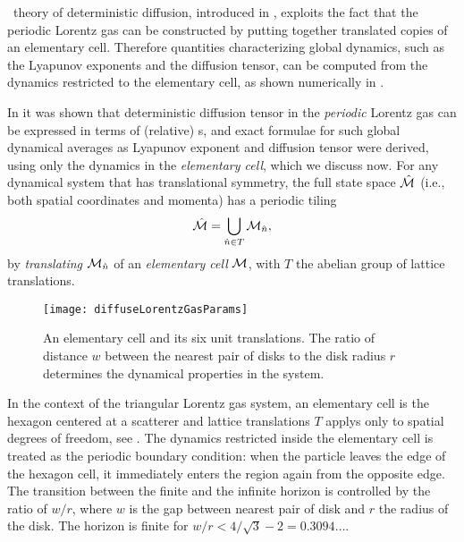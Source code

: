

\Po\ theory of deterministic diffusion, introduced in
, exploits the fact that the periodic
Lorentz gas can be constructed by putting together translated copies
of an elementary cell.  Therefore quantities characterizing global
dynamics, such as the Lyapunov exponents and the diffusion tensor, can
be computed from the dynamics restricted to the elementary cell, as
shown numerically in .

In  it was shown
that deterministic diffusion tensor in the {\em periodic} Lorentz gas
can be expressed in terms of (relative) \po s, and exact formulae for
such global dynamical averages as Lyapunov exponent and diffusion
tensor were derived, using only the dynamics in the \emph{elementary
cell}, which we discuss now. For any dynamical system that has
translational symmetry, the full state space $\hat {{\cal M}}$ (i.e., both spatial
coordinates and momenta) has a periodic tiling
\[ %
\hM=\bigcup_{ \hn \in T} \pS_{\hn},
\] %
by {\em translating} ${\cal M}_{\hat{n}}$ of an {\em elementary cell} ${\cal M}$,
with $T$ the abelian group of lattice translations.

\begin{figure}[htbp]
	\begin{center}
    \texttt{[image: diffuseLorentzGasParams]}
	\end{center}
	\caption[]{\label{fig-LorentzGasParams}
        An elementary cell and its six unit translations. The ratio of
        distance $w$ between the nearest pair of disks to the    disk
        radius $r$ determines the dynamical properties in the system.
	}
\end{figure}

In the context of the triangular Lorentz gas system, an elementary
cell is the hexagon centered at a scatterer and lattice translations
$T$ applys only to spatial degrees of freedom, see
. The dynamics restricted inside the
elementary cell is treated as the periodic boundary condition: when
the particle leaves the edge of the hexagon cell, it immediately
enters the region again from the opposite edge. The transition between
the finite and the infinite horizon is controlled by the ratio of $w/r$,
where $w$ is the gap between nearest pair of disk and $r$ the radius
of the disk. The horizon is finite for $w/r < 4/\sqrt{3}-2 =
0.3094\dots$.

